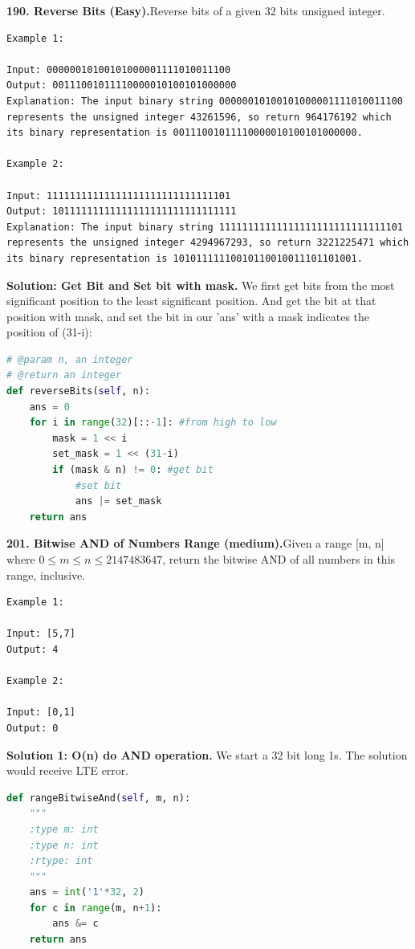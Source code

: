 \documentclass[../main.tex]{subfiles}
\begin{document}
\begin{examples}[resume]
\item \textbf{190. Reverse Bits (Easy).}Reverse bits of a given 32 bits unsigned integer.
\begin{lstlisting}[numbers=none]
Example 1:

Input: 00000010100101000001111010011100
Output: 00111001011110000010100101000000
Explanation: The input binary string 00000010100101000001111010011100 represents the unsigned integer 43261596, so return 964176192 which its binary representation is 00111001011110000010100101000000.

Example 2:

Input: 11111111111111111111111111111101
Output: 10111111111111111111111111111111
Explanation: The input binary string 11111111111111111111111111111101 represents the unsigned integer 4294967293, so return 3221225471 which its binary representation is 10101111110010110010011101101001.
\end{lstlisting}

\textbf{Solution: Get Bit and Set bit with mask.} We first get bits from the most significant position to the least significant position. And get the bit at that position with mask, and set the bit in our 'ans' with a mask indicates the position of (31-i):
\begin{lstlisting}[language=Python]
# @param n, an integer
# @return an integer
def reverseBits(self, n):
    ans = 0
    for i in range(32)[::-1]: #from high to low
        mask = 1 << i
        set_mask = 1 << (31-i)
        if (mask & n) != 0: #get bit
            #set bit 
            ans |= set_mask
    return ans
\end{lstlisting}

\item \textbf{201. Bitwise AND of Numbers Range (medium).}Given a range [m, n] where $0 \leq m \leq n \leq 2147483647$, return the bitwise AND of all numbers in this range, inclusive.
\begin{lstlisting}[numbers=none]
Example 1:

Input: [5,7]
Output: 4

Example 2:

Input: [0,1]
Output: 0
\end{lstlisting}

\textbf{Solution 1: O(n) do AND operation.} We start a 32 bit long 1s. The solution would receive LTE error. 
\begin{lstlisting}[language=Python]
def rangeBitwiseAnd(self, m, n):
    """
    :type m: int
    :type n: int
    :rtype: int
    """
    ans = int('1'*32, 2)
    for c in range(m, n+1):
        ans &= c            
    return ans
\end{lstlisting}


\end{examples}
\end{document}
